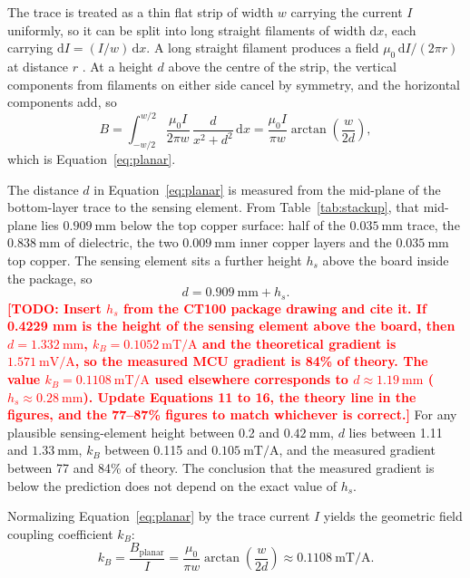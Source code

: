 \documentclass[12pt,a4paper]{article}
\newcommand{\todo}[1]{\textcolor{red}{\textbf{[TODO: #1]}}}
\begin{document}
The trace is treated as a thin flat strip of width $w$ carrying the current $I$ uniformly, so it can be split into long straight filaments of width $\mathrm{d}x$, each carrying $\mathrm{d}I = (I/w)\,\mathrm{d}x$. A long straight filament produces a field $\mu_0\,\mathrm{d}I/(2\pi r)$ at distance $r$ \cite{openstax_up2}. At a height $d$ above the centre of the strip, the vertical components from filaments on either side cancel by symmetry, and the horizontal components add, so
\begin{equation}
B = \int_{-w/2}^{w/2} \frac{\mu_0 I}{2\pi w}\,\frac{d}{x^2+d^2}\,\mathrm{d}x = \frac{\mu_0 I}{\pi w}\arctan\!\left(\frac{w}{2d}\right),
\end{equation}
which is Equation~\eqref{eq:planar}.

The distance $d$ in Equation~\eqref{eq:planar} is measured from the mid-plane of the bottom-layer trace to the sensing element. From Table~\ref{tab:stackup}, that mid-plane lies $\SI{0.909}{\milli\metre}$ below the top copper surface: half of the $\SI{0.035}{\milli\metre}$ trace, the $\SI{0.838}{\milli\metre}$ of dielectric, the two $\SI{0.009}{\milli\metre}$ inner copper layers and the $\SI{0.035}{\milli\metre}$ top copper. The sensing element sits a further height $h_s$ above the board inside the package, so
\begin{equation}
d = \SI{0.909}{\milli\metre} + h_s .
\label{eq:d-stackup}
\end{equation}
\todo{Insert $h_s$ from the CT100 package drawing and cite it. If 0.4229 mm is the height of the sensing element above the board, then $d = \SI{1.332}{\milli\metre}$, $k_B = \SI{0.1052}{\milli\tesla\per\ampere}$ and the theoretical gradient is $\SI{1.571}{\milli\volt\per\ampere}$, so the measured MCU gradient is 84\% of theory. The value $k_B = \SI{0.1108}{\milli\tesla\per\ampere}$ used elsewhere corresponds to $d \approx \SI{1.19}{\milli\metre}$ ($h_s \approx \SI{0.28}{\milli\metre}$). Update Equations 11 to 16, the theory line in the figures, and the 77--87\% figures to match whichever is correct.}
For any plausible sensing-element height between 0.2 and $\SI{0.42}{\milli\metre}$, $d$ lies between 1.11 and $\SI{1.33}{\milli\metre}$, $k_B$ between 0.115 and $\SI{0.105}{\milli\tesla\per\ampere}$, and the measured gradient between 77 and 84\% of theory. The conclusion that the measured gradient is below the prediction does not depend on the exact value of $h_s$.

Normalizing Equation~\eqref{eq:planar} by the trace current $I$ yields the geometric field coupling coefficient $k_B$:
\begin{equation}
k_B = \frac{B_{\text{planar}}}{I} = \frac{\mu_0}{\pi w} \arctan\left( \frac{w}{2d} \right) \approx \SI{0.1108}{\milli\tesla\per\ampere}.
\label{eq:field-coeff}
\end{equation}
\end{document}
